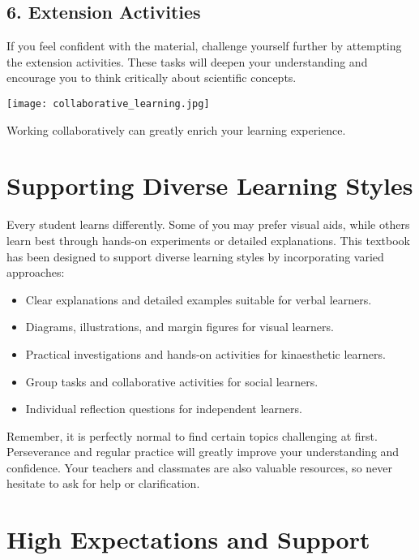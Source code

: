 \subsection*{6. Extension Activities}
If you feel confident with the material, challenge yourself further by attempting the extension activities. These tasks will deepen your understanding and encourage you to think critically about scientific concepts.

\begin{marginfigure}[0pt]
    \texttt{[image: collaborative\_learning.jpg]}
    \caption{Working collaboratively can greatly enrich your learning experience.}
\end{marginfigure}

\FloatBarrier

\section{Supporting Diverse Learning Styles}

Every student learns differently. Some of you may prefer visual aids, while others learn best through hands-on experiments or detailed explanations. This textbook has been designed to support diverse learning styles by incorporating varied approaches:

\begin{itemize}
    \item Clear explanations and detailed examples suitable for verbal learners.
    \item Diagrams, illustrations, and margin figures for visual learners.
    \item Practical investigations and hands-on activities for kinaesthetic learners.
    \item Group tasks and collaborative activities for social learners.
    \item Individual reflection questions for independent learners.
\end{itemize}

Remember, it is perfectly normal to find certain topics challenging at first. Perseverance and regular practice will greatly improve your understanding and confidence. Your teachers and classmates are also valuable resources, so never hesitate to ask for help or clarification.

\section{High Expectations and Support}

